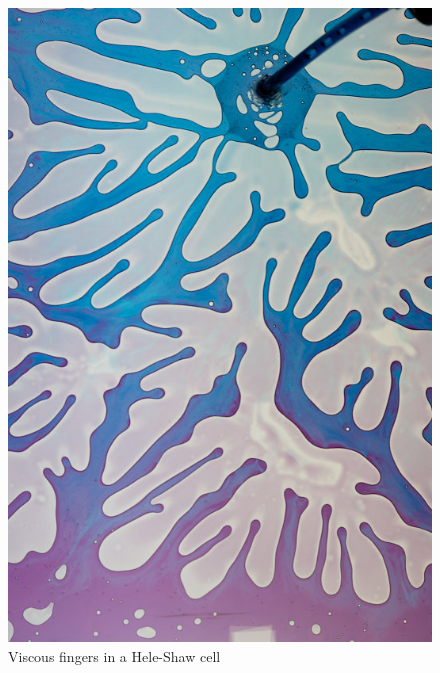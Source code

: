\documentclass[screen, aspectratio=43]{beamer}
\begin{document}
\begin{frame}
{\begin{columns}
\begin{column}{0.25\textwidth}
\begin{figure}[h]
          \includegraphics[trim={0 0 5cm 0}, clip, width = \textwidth]{figures/misc/mf}
          \caption{\scriptsize Viscous fingers in a Hele-Shaw cell}
        \end{figure}
      \end{column}
    \end{columns}
  }
\end{frame}
\end{document}

